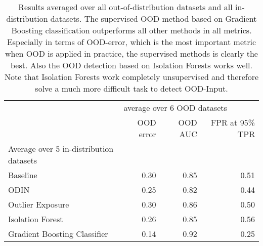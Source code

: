 \begin{table}
\centering
\caption{Results averaged over all out-of-distribution datasets and all in-distribution datasets. The supervised OOD-method based on Gradient Boosting classification outperforms all other methods in all metrics. Especially in terms of OOD-error, which is the most important metric when OOD is applied in practice, the supervised methods is clearly the best. Also the OOD detection based on Isolation Forests works well. Note that Isolation Forests work completely unsupervised and therefore solve a much more difficult task to detect OOD-Input.}
\label{allAvgOODResult}
\begin{tabular}{lrrr}
\toprule
{} & \multicolumn{3}{l}{average over 6 OOD datasets} \\
{} &                   OOD error & OOD AUC & FPR at 95\% TPR \\
Average over 5 in-distribution datasets &                             &         &                \\
\midrule
Baseline                                &                        0.30 &    0.85 &           0.51 \\
ODIN                                    &                        0.25 &    0.82 &           0.44 \\
Outlier Exposure                        &                        0.30 &    0.86 &           0.50 \\
Isolation Forest                        &                        0.26 &    0.85 &           0.56 \\
Gradient Boosting Classifier            &                        0.14 &    0.92 &           0.25 \\
\bottomrule
\end{tabular}
\end{table}
